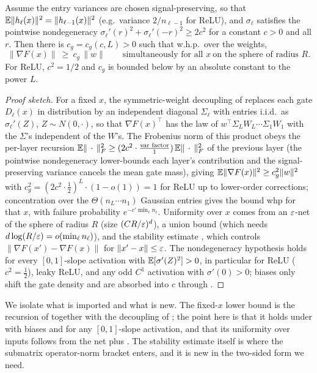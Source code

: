 \begin{proposition}\label{prop:gradlb}
Assume the entry variances are chosen signal-preserving, so that $\mathbb{E}\|h_\ell(x)\|^2=\|h_{\ell-1}(x)\|^2$
(e.g.\ variance $2/n_{\ell-1}$ for ReLU), and $\sigma_\ell$ satisfies the pointwise nondegeneracy
$\sigma_\ell'(r)^2+\sigma_\ell'(-r)^2\ge 2c^2$ for a constant $c>0$ and all $r$. Then there is
$c_g=c_g(c,L)>0$ such that w.h.p.\ over the weights,
\[
  \|\nabla F(x)\|\ \ge\ c_g\,\|w\|\qquad\text{simultaneously for all }x\ \text{on the sphere of radius }R.
\]
For ReLU, $c^2=1/2$ and $c_g$ is bounded below by an absolute constant to the power $L$.
\end{proposition}

\begin{proof}[Proof sketch]
For a fixed $x$, the symmetric-weight decoupling of \cite{bubeckCGT21} replaces each gate $D_\ell(x)$
in distribution by an independent diagonal $\Sigma_\ell$ with entries i.i.d.\ as $\sigma_\ell'(Z)$,
$Z\sim N(0,\cdot)$, so that $\nabla F(x)^\top$ has the law of $w^\top\Sigma_LW_L\cdots\Sigma_1W_1$ with
the $\Sigma$'s independent of the $W$'s. The Frobenius norm of this product obeys the per-layer
recursion $\mathbb{E}\|\,\cdot\,\|_F^2\ge (2c^2\cdot\tfrac{\text{var factor}}{1})\,\mathbb{E}\|\,\cdot\,\|_F^2$ of
the previous layer (the pointwise nondegeneracy lower-bounds each layer's contribution and the
signal-preserving variance cancels the mean gate mass), giving
$\mathbb{E}\|\nabla F(x)\|^2\ge c_g^2\|w\|^2$ with $c_g^2=(2c^2\cdot\tfrac12)^{L}\cdot(1-o(1))=1$ for ReLU up
to lower-order corrections; concentration over the $\Theta(n_L\cdots n_1)$ Gaussian entries gives the
bound whp for that $x$, with failure probability $e^{-c'\min_\ell n_\ell}$. Uniformity over $x$ comes
from an $\varepsilon$-net of the sphere of radius $R$ (size $(CR/\varepsilon)^d$), a union bound (which needs
$d\log(R/\varepsilon)=o(\min_\ell n_\ell)$), and the stability estimate , which controls
$\|\nabla F(x')-\nabla F(x)\|$ for $\|x'-x\|\le\varepsilon$. The nondegeneracy hypothesis holds for every
$[0,1]$-slope activation with $\mathbb{E}[\sigma'(Z)^2]>0$, in particular for ReLU ($c^2=\tfrac12$), leaky
ReLU, and any odd $C^1$ activation with $\sigma'(0)>0$; biases only shift the gate density and are
absorbed into $c$ through .
\end{proof}

We isolate what is imported and what is new. The fixed-$x$ lower bound is the recursion of
\cite{danielyM26,advExt} together with the decoupling of \cite{bubeckCGT21}; the point here is that it
holds under  with biases and for any $[0,1]$-slope activation, and that its
uniformity over inputs follows from the net plus . The stability estimate itself is
where the submatrix operator-norm bracket enters, and it is new in the two-sided form we need.

